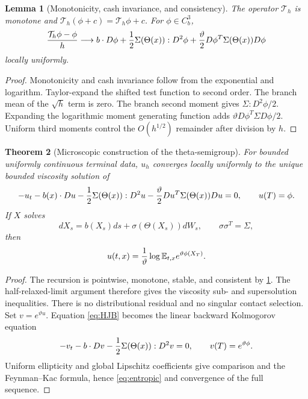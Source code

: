 \documentclass[11pt,reqno]{amsart}
\newtheorem{theorem}{Theorem}[section]
\newtheorem{lemma}[theorem]{Lemma}
\theoremstyle{definition}
\theoremstyle{remark}
\newcommand{\E}{\mathbb E}
\begin{document}
\begin{lemma}[Monotonicity, cash invariance, and consistency]\label{lem:consistency}
The operator $\mathcal T_h$ is monotone and
$\mathcal T_h(\phi+c)=\mathcal T_h\phi+c$.  For
$\phi\in C_b^3$,
\begin{equation}\label{eq:consistency}
 {\mathcal T_h\phi-\phi\over h}
 \longrightarrow
 b\cdot D\phi+{1\over2}\Sigma(\Theta(x)):D^2\phi
 +{\vartheta\over2}D\phi^T\Sigma(\Theta(x))D\phi
\end{equation}
locally uniformly.
\end{lemma}

\begin{proof}
Monotonicity and cash invariance follow from the exponential and logarithm.
Taylor-expand the shifted test function to second order.  The branch mean of
the $\sqrt h$ term is zero.  The branch second moment gives
$\Sigma:D^2\phi/2$.  Expanding the logarithmic moment generating function adds
$\vartheta D\phi^T\Sigma D\phi/2$.  Uniform third moments control the
$O(h^{1/2})$ remainder after division by $h$.
\end{proof}

\begin{theorem}[Microscopic construction of the theta-semigroup]\label{thm:HJB}
For bounded uniformly continuous terminal data, $u_h$ converges locally
uniformly to the unique bounded viscosity solution of
\begin{equation}\label{eq:HJB}
 -u_t-b(x)\cdot Du-{1\over2}\Sigma(\Theta(x)):D^2u
 -{\vartheta\over2}Du^T\Sigma(\Theta(x))Du=0,
 \qquad u(T)=\phi.
\end{equation}
If $X$ solves
\[
 dX_s=b(X_s)ds+\sigma(\Theta(X_s))dW_s,
 \qquad \sigma\sigma^T=\Sigma,
\]
then
\begin{equation}\label{eq:entropic}
 u(t,x)={1\over\vartheta}
 \log\E_{t,x}e^{\vartheta\phi(X_T)}.
\end{equation}
\end{theorem}

\begin{proof}
The recursion is pointwise, monotone, stable, and consistent by
\cref{lem:consistency}.  The half-relaxed-limit argument therefore gives the
viscosity sub- and supersolution inequalities.  There is no distributional
residual and no singular contact selection.  Set $v=e^{\vartheta u}$.
Equation \eqref{eq:HJB} becomes the linear backward Kolmogorov equation
\[
 -v_t-b\cdot Dv-{1\over2}\Sigma(\Theta(x)):D^2v=0,
 \qquad v(T)=e^{\vartheta\phi}.
\]
Uniform ellipticity and global Lipschitz coefficients give comparison and the
Feynman--Kac formula, hence \eqref{eq:entropic} and convergence of the full
sequence.
\end{proof}
\end{document}
